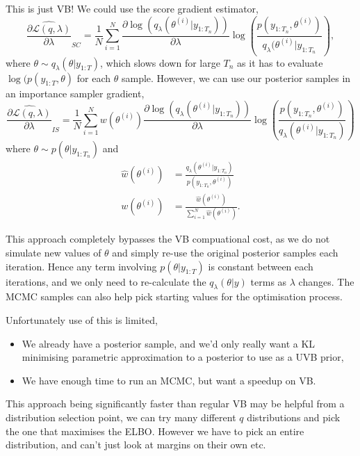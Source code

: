 \documentclass[
12pt, %
onehalfspacing, %
nohyperref, %
headsepline, %
chapterinoneline, %
]{MastersDoctoralThesis} %
\begin{document}
This is just VB! We could use the score gradient estimator,
\begin{equation}
\label{MCMCVB:scoreEst}
\widehat{\frac{\partial\mathcal{L}(q, \lambda)}{\partial \lambda}}_{SC} = \frac{1}{N} \sum_{i = 1}^N \frac{\partial \log(q_{\lambda}(\theta^{(i)} | y_{1:T_n}))}{\partial \lambda} \log \left(\frac{p(y_{1:T_n}, \theta^{(i)})}{q_{\lambda}(\theta^{(i)} | y_{1:T_n}} \right),
\end{equation}
where $\theta \sim q_{\lambda}(\theta | y_{1:T})$, which slows down for large $T_n$ as it has to evaluate $\log(p(y_{1:T}, \theta)$ for each $\theta$ sample. However, we can use our posterior samples in an importance sampler gradient,
\begin{equation}
\label{MCMCVB:DerivP}
\widehat{\frac{\partial\mathcal{L}(q, \lambda)}{\partial \lambda}}_{IS} = \frac{1}{N} \sum_{i=1}^N w(\theta^{(i)}) \frac{\partial \log(q_{\lambda}(\theta^{(i)} | y_{1:T_n}))}{\partial \lambda} \log \left( \frac{p(y_{1:T_n}, \theta^{(i)})}{q_{\lambda}(\theta^{(i)} | y_{1:T_n})} \right)
\end{equation}
where $\theta \sim p(\theta | y_{1:T_n})$ and 
\begin{align}
\hat{w}(\theta^{(i)}) &= \frac{q_{\lambda}(\theta^{(i)} | y_{1:T_n})}{p( y_{1:T_n}, \theta^{(i)})} \\
w(\theta^{(i)}) &= \frac{\hat{w}(\theta^{(i)})}{\sum_{i=1}^N \hat{w}(\theta^{(i)})}. 
\end{align}

This approach completely bypasses the VB compuational cost, as we do not simulate new values of $\theta$ and simply re-use the original posterior samples each iteration. Hence any term involving $p(\theta | y_{1:T})$ is constant between each iterations, and we only need to re-calculate the $q_{\lambda}(\theta | y)$ terms as $\lambda$ changes. The MCMC samples can also help pick starting values for the optimisation process.

Unfortunately use of this is limited,
\begin{itemize}
\item We already have a posterior sample, and we'd only really want a KL minimising parametric approximation to a posterior to use as a UVB prior,
\item We have enough time to run an MCMC, but want a speedup on VB.
\end{itemize}
This approach being significantly faster than regular VB may be helpful from a distribution selection point, we can try many different $q$ distributions and pick the one that maximises the ELBO. However we have to pick an entire distribution, and can't just look at margins on their own etc.
\end{document}

